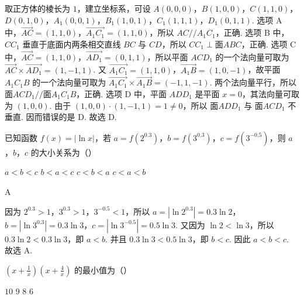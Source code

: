 \documentclass[UTF8,a4paper,oneside,11pt]{ctexbook}
\begin{document}
\begin{solution}
取正方体的棱长为 \(1\)，建立坐标系，可设 \(A(0,0,0)\)，\(B(1,0,0)\)，\(C(1,1,0)\)，\(D(0,1,0)\)，\(A_1(0,0,1)\)，\(B_1(1,0,1)\)，\(C_1(1,1,1)\)，\(D_1(0,1,1)\).
选项 A 中，\(\overrightarrow{AC}=\left( 1,1,0 \right)\)，\(\overrightarrow{A_1C_1}=\left( 1,1,0 \right)\)，所以 \(AC//A_1C_1\)，正确.
选项 B 中，\(CC_1\) 垂直于底面内两条相交直线 \(BC\) 与 \(CD\)，所以 \(CC_1\perp \text{面} ABC\)，正确.
选项 C 中，\(\overrightarrow{AC}=\left( 1,1,0 \right)\)，\(\overrightarrow{AD_1}=\left( 0,1,1 \right)\)，所以平面 \(ACD_1\) 的一个法向量可取为 \(\overrightarrow{AC}\times \overrightarrow{AD_1}=\left( 1,-1,1 \right)\). 又 \(\overrightarrow{A_1C_1}=\left( 1,1,0 \right)\)，\(\overrightarrow{A_1B}=\left( 1,0,-1 \right)\)，故平面 \(A_1C_1B\) 的一个法向量可取为 \(\overrightarrow{A_1C_1}\times \overrightarrow{A_1B}=\left( -1,1,-1 \right)\). 两个法向量平行，所以 \(\text{面} ACD_1//\text{面} A_1C_1B\)，正确.
选项 D 中，平面 \(ADD_1\) 是平面 \(x=0\)，其法向量可取为 \(\left( 1,0,0 \right)\). 由于 \(\left( 1,0,0 \right)\cdot \left( 1,-1,1 \right)=1\ne 0\)，所以 \(\text{面} ADD_1\) 与 \(\text{面} ACD_1\) 不垂直. 因而错误的是 D.
故选 D.
\end{solution}

\begin{problem}
已知函数 \(f(x)=|\ln x|\)，若 \(a=f\left( 2^{0.3} \right)\)，\(b=f\left( 3^{0.3} \right)\)，\(c=f\left( 3^{-0.5} \right)\)，则 \(a\)，\(b\)，\(c\) 的大小关系为（\quad）

\choices
    {\(a<b<c\)}
    {\(b<a<c\)}
    {\(c<b<a\)}
    {\(c<a<b\)}
\end{problem}

\begin{answer}
A
\end{answer}

\begin{solution}
因为 \(2^{0.3}>1\)，\(3^{0.3}>1\)，\(3^{-0.5}<1\)，所以 \(a=\left| \ln 2^{0.3} \right|=0.3\ln 2\)，\(b=\left| \ln 3^{0.3} \right|=0.3\ln 3\)，\(c=\left| \ln 3^{-0.5} \right|=0.5\ln 3\).
又因为 \(\ln 2<\ln 3\)，所以 \(0.3\ln 2<0.3\ln 3\)，即 \(a<b\).
并且 \(0.3\ln 3<0.5\ln 3\)，即 \(b<c\).
因此 \(a<b<c\).
故选 A.
\end{solution}

\begin{problem}
\(\left( x+\frac{1}{x} \right)\left( x+\frac{4}{x} \right)\) 的最小值为（\quad）

\choices
    {\(10\)}
    {\(9\)}
    {\(8\)}
    {\(6\)}
\end{problem}
\end{document}

